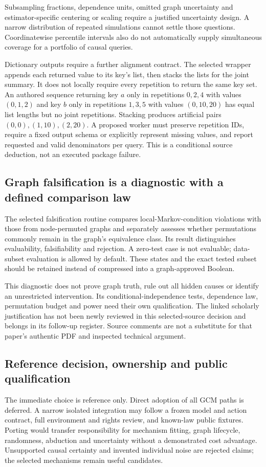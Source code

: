 Subsampling fractions, dependence units, omitted graph uncertainty and
estimator-specific centering or scaling require a justified uncertainty
design. A narrow distribution of repeated simulations cannot settle those
questions. Coordinatewise percentile intervals also do not automatically
supply simultaneous coverage for a portfolio of causal queries.
\citep{exec24_gcm_choice}

Dictionary outputs require a further alignment contract. The selected
wrapper appends each returned value to its key's list, then stacks the
lists for the joint summary. It does not locally require every repetition
to return the same key set. An authored sequence returning key $a$ only
in repetitions $0,2,4$ with values $(0,1,2)$ and key $b$ only in
repetitions $1,3,5$ with values $(0,10,20)$ has equal list lengths but
no joint repetitions. Stacking produces artificial pairs
$(0,0),(1,10),(2,20)$. A proposed worker must preserve repetition IDs,
require a fixed output schema or explicitly represent missing values,
and report requested and valid denominators per query. This is a
conditional source deduction, not an executed package failure.
\citep{exec24_gcm_source,exec24_gcm_choice}

\subsection{Graph falsification is a diagnostic with a defined comparison law}
The selected falsification routine compares local-Markov-condition
violations with those from node-permuted graphs and separately assesses
whether permutations commonly remain in the graph's equivalence class.
Its result distinguishes evaluability, falsifiability and rejection.
A zero-test case is not evaluable; data-subset evaluation is allowed by
default. These states and the exact tested subset should be retained
instead of compressed into a graph-approved Boolean.
\citep{exec24_gcm_source}

This diagnostic does not prove graph truth, rule out all hidden causes
or identify an unrestricted intervention. Its conditional-independence
tests, dependence law, permutation budget and power need their own
qualification. The linked scholarly justification has not been newly
reviewed in this selected-source decision and belongs in its follow-up
register. Source comments are not a substitute for that paper's authentic
PDF and inspected technical argument.\citep{exec24_gcm_choice}

\subsection{Reference decision, ownership and public qualification}
The immediate choice is reference only. Direct adoption of all GCM paths
is deferred. A narrow isolated integration may follow a frozen model and
action contract, full environment and rights review, and known-law public
fixtures. Porting would transfer responsibility for mechanism fitting,
graph lifecycle, randomness, abduction and uncertainty without a demonstrated
cost advantage. Unsupported causal certainty and invented individual noise
are rejected claims; the selected mechanisms remain useful candidates.
\citep{exec24_gcm_choice}

